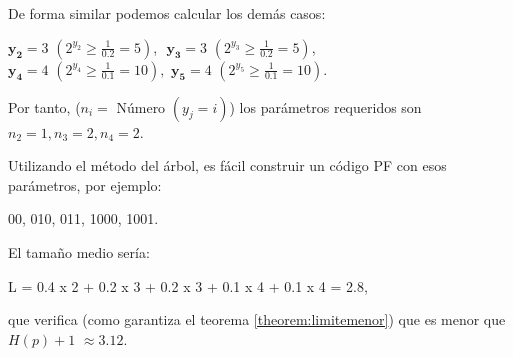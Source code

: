 \documentclass{beamer}
\begin{document}
\begin{frame}  \small

De forma similar podemos calcular los demás casos:

\begin{center}
$\mathbf {y_2} = 3$ \tiny{$(2^{y_{2}} \geq \frac{1}{0.2} = 5)$}, \small $\,\, \mathbf {y_3} = 3$ \tiny $(2^{y_{3}} \geq \frac{1}{0.2} = 5)$,\\
\vspace{0.25cm}
\small $\mathbf {y_4} = 4$  \tiny $(2^{y_{4}} \geq \frac{1}{0.1} = 10),$\small $ \,\, \mathbf {y_5} = 4 $  \tiny  $(2^{y_{5}} \geq \frac{1}{0.1} = 10).$
\end{center}

Por tanto,  ($n_i=$ Número $(y_j = i)$) los parámetros requeridos son $n_2 = 1,n_3 = 2,n_4 = 2$. 

\vspace{0.5cm}

Utilizando el método del árbol, es fácil construir un código PF con esos parámetros, por ejemplo: 

\begin{center}
 00, 010, 011, 1000, 1001.
\end{center}	

El tamaño medio sería: 

\begin{center}
L = 0.4 x 2 + 0.2 x 3 + 0.2 x 3 + 0.1 x 4 + 0.1 x 4 = 2.8,
\end{center}

que verifica (como garantiza el teorema \ref{theorem:limitemenor}) que es menor que $H(p) + 1$ $\approx 3.12.$

\end{frame} 
\end{document}

